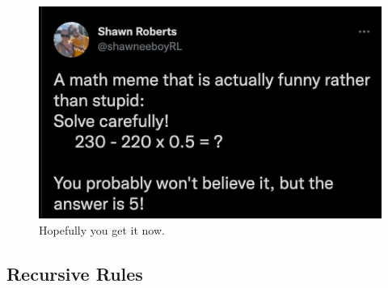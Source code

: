 %



\begin{figure}[h!]
	\centering
	\includegraphics[width=0.7\linewidth]{pics/factorial}
	\caption{Hopefully you get it now.}
	\label{fig:factorial_meme}
\end{figure}



\subsection{Recursive Rules}

